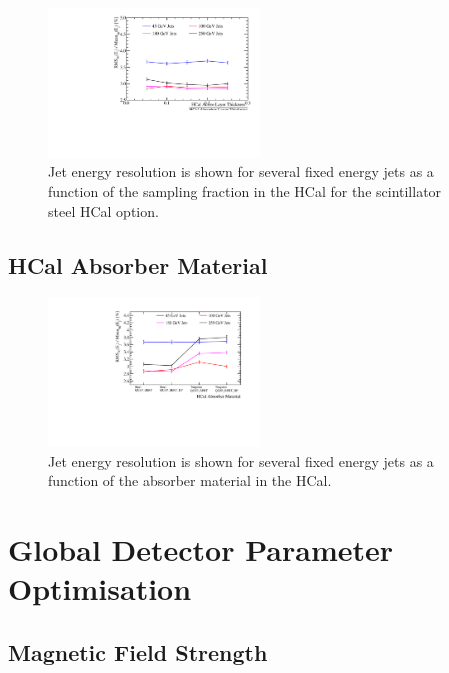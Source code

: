 \begin{figure}
  \includegraphics[width=0.5\textwidth]{OptimisationStudies/Plots/JetEnergyResolutions/JER_vs_SamplingFractionInTheHCal.pdf}
  \caption[Jet energy resolution as a function of the sampling fraction in the HCal for the scintillator steel HCal option.]{Jet energy resolution is shown for several fixed energy jets as a function of the sampling fraction in the HCal for the scintillator steel HCal option.}
  \label{optstud:fig:hcalsampfrac}
\end{figure}

\subsection{HCal Absorber Material}
\label{optstud:sec:hcal:absmat}

\begin{figure}
  \includegraphics[width=0.5\textwidth]{OptimisationStudies/Plots/JetEnergyResolutions/JER_vs_HCalAbsorberMaterial.pdf}
  \caption[Jet energy resolution as a function of the absorber matieral in the HCal.]{Jet energy resolution is shown for several fixed energy jets as a function of the absorber material in the HCal.}
  \label{optstud:fig:hcalabsmat}
\end{figure}

\section{Global Detector Parameter Optimisation}
\label{optstud:sec:global}

\subsection{Magnetic Field Strength}
\label{optstud:sec:glob:bfield}

